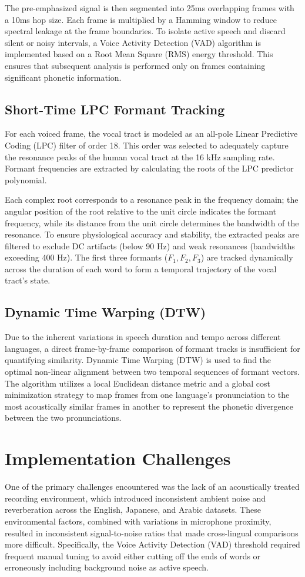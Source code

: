 \documentclass[11pt, letterpaper]{article}
\begin{document}
The pre-emphasized signal is then segmented into 25ms overlapping frames with a 10ms hop size. Each frame is multiplied by a Hamming window to reduce spectral leakage at the frame boundaries. To isolate active speech and discard silent or noisy intervals, a Voice Activity Detection (VAD) algorithm is implemented based on a Root Mean Square (RMS) energy threshold. This ensures that subsequent analysis is performed only on frames containing significant phonetic information.

\subsection{Short-Time LPC Formant Tracking}
For each voiced frame, the vocal tract is modeled as an all-pole Linear Predictive Coding (LPC) filter of order 18. This order was selected to adequately capture the resonance peaks of the human vocal tract at the 16 kHz sampling rate. Formant frequencies are extracted by calculating the roots of the LPC predictor polynomial. 

Each complex root corresponds to a resonance peak in the frequency domain; the angular position of the root relative to the unit circle indicates the formant frequency, while its distance from the unit circle determines the bandwidth of the resonance. To ensure physiological accuracy and stability, the extracted peaks are filtered to exclude DC artifacts (below 90 Hz) and weak resonances (bandwidths exceeding 400 Hz). The first three formants ($F_1, F_2, F_3$) are tracked dynamically across the duration of each word to form a temporal trajectory of the vocal tract's state.

\subsection{Dynamic Time Warping (DTW)}
Due to the inherent variations in speech duration and tempo across different languages, a direct frame-by-frame comparison of formant tracks is insufficient for quantifying similarity. 
Dynamic Time Warping (DTW) is used to find the optimal non-linear alignment between two temporal sequences of formant vectors. 
The algorithm utilizes a local Euclidean distance metric and a global cost minimization strategy to map frames from one language's pronunciation to the most acoustically similar frames in another to represent the phonetic divergence between the two pronunciations.

\section{Implementation Challenges}
One of the primary challenges encountered was the lack of an acoustically treated recording environment, which introduced inconsistent ambient noise and reverberation across the English, Japanese, and Arabic datasets. 
These environmental factors, combined with variations in microphone proximity, resulted in inconsistent signal-to-noise ratios that made cross-lingual comparisons more difficult. 
Specifically, the Voice Activity Detection (VAD) threshold required frequent manual tuning to avoid either cutting off the ends of words or erroneously including background noise as active speech.
\end{document}
